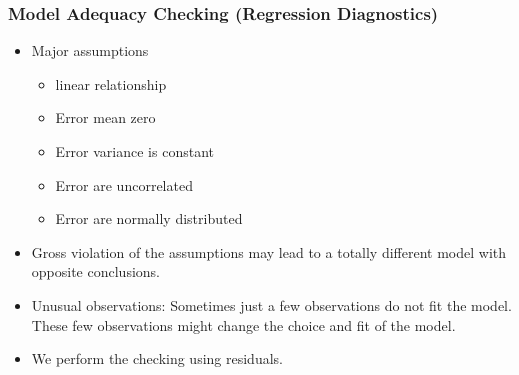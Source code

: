 \documentclass[10pt]{beamer} %
\begin{document}
\begin{frame}
   \frametitle{Model Adequacy Checking (Regression Diagnostics)}
   \begin{itemize}
      \item Major assumptions
         \begin{itemize}
            \item linear relationship
               \vspace{0.25cm}
            \item Error mean zero
               \vspace{0.25cm}
            \item Error variance is constant
               \vspace{0.25cm}
            \item Error are uncorrelated
               \vspace{0.25cm}
            \item Error are normally distributed
         \end{itemize}
      \item Gross violation of the assumptions may lead to a totally different
         model with opposite conclusions. 	
      \item Unusual observations: Sometimes just a few observations do not fit
         the model.  These few observations might change the choice and fit of
         the model.
      \item We perform the checking using residuals.
   \end{itemize}
\end{frame}
\end{document}
